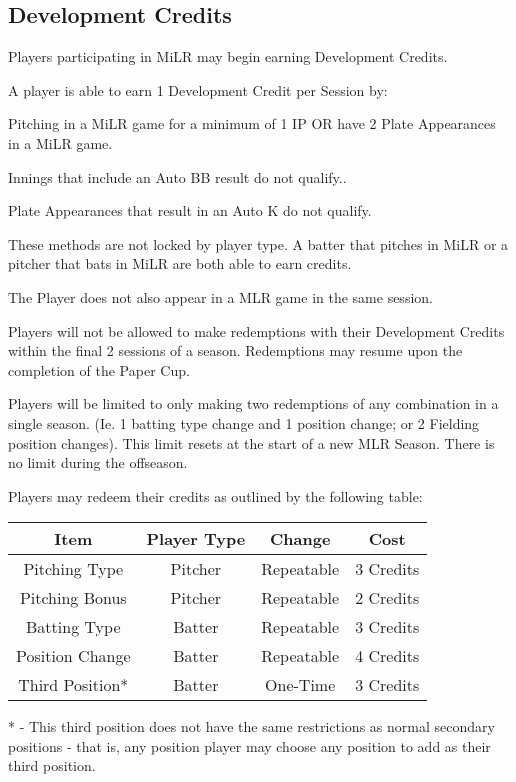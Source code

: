 \subsection{Development Credits}
\label{sec:Development Credits}
\begin{deepEnumerate}
    \item Players participating in MiLR may begin earning Development Credits.
    \item A player is able to earn 1 Development Credit per Session by:
    \begin{deepEnumerate}
        \item Pitching in a MiLR game for a minimum of 1 IP {OR} have 2 Plate Appearances in a MiLR game. 
        \begin{deepEnumerate}
            \item Innings that include an Auto BB result do not qualify..
            \item Plate Appearances that result in an Auto K do not qualify.
            \item These methods are not locked by player type. A batter that pitches in MiLR or a pitcher that bats in MiLR are both able to earn credits.
        \end{deepEnumerate}
        \item The Player {does not} also appear in a MLR game in the same session.
    \end{deepEnumerate}
    \item Players will {not} be allowed to make redemptions with their Development Credits within the final 2 sessions of a season. Redemptions may resume upon the completion of the Paper Cup.
    \item Players will be limited to only making {two} redemptions of any combination in a single season. (Ie. 1 batting type change and 1 position change; or 2 Fielding position changes). This limit resets at the start of a new MLR Season. There is no limit during the offseason.
    \item Players may redeem their credits as outlined by the following table:
\end{deepEnumerate}

\begin{center}
	\begin{tabular}{|c|c|c|c|}
		\hline 
		Item & Player Type & Change & Cost \\
		\hline 
		Pitching Type & Pitcher & Repeatable & 3 Credits \\
		\hline 
		Pitching Bonus & Pitcher & Repeatable & 2 Credits \\
        \hline 
		Batting Type & Batter & Repeatable & 3 Credits \\
        \hline 
		Position Change & Batter & Repeatable & 4 Credits \\
        \hline 
		Third Position* & Batter & One-Time & 3 Credits \\
		\hline
	\end{tabular}
\end{center}
* - This third position does not have the same restrictions as normal secondary positions - that is, any position player may choose any position to add as their third position.

